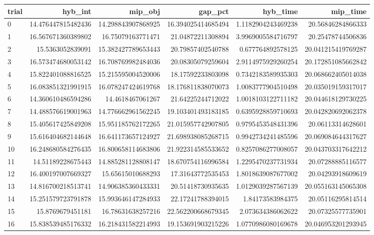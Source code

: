 \begin{tabular}{lrrrrr}
\hline
trial & hyb_int & mip_obj & gap_pct & hyb_time & mip_time \\ \hline
0 & 14.476447815482436 & 14.298843907868925 & 16.394025414685494 & 1.1182904243469238 & 20.56846284866333 \\
1 & 16.567671360389802 & 16.75079163771471 & 21.04872211308894 & 3.9969005584716797 & 20.25478744506836 \\
2 & 15.5363052839091 & 15.382427789653443 & 20.79857402540788 & 0.677764892578125 & 20.041215419769287 \\
3 & 16.573474680053142 & 16.708769982484036 & 20.08305079259604 & 2.9114975929260254 & 20.172851085662842 \\
4 & 15.822401088816525 & 15.215595004520006 & 18.17592233803098 & 0.7342183589935303 & 20.068662405014038 \\
5 & 16.083851321991915 & 16.078247424619768 & 18.176811838070073 & 1.0083777904510498 & 20.035019159317017 \\
6 & 14.360610486594286 & 14.4618467061267 & 21.64225244712022 & 1.0018103122711182 & 20.044618129730225 \\
7 & 14.488576619001963 & 14.776662961562245 & 19.103401493183185 & 0.6395928859710693 & 20.042820692062378 \\
8 & 15.405617425849208 & 15.951185762172265 & 21.015957742907805 & 0.9795453548431396 & 20.06113314628601 \\
9 & 15.616404682144648 & 16.641173657124927 & 21.698938085268715 & 0.9942734241485596 & 20.069084644317627 \\
10 & 16.248680584276435 & 16.800658114683806 & 21.922314585533652 & 0.8257086277008057 & 20.043703317642212 \\
11 & 14.51189228675443 & 14.885281128808147 & 18.670754116996584 & 1.2295470237731934 & 20.07288885116577 \\
12 & 16.400197007669327 & 15.65615010688293 & 17.31643772535453 & 1.8018639087677002 & 20.04293918609619 \\
13 & 14.816700218513741 & 14.906385360433331 & 20.51418730935635 & 1.0129039287567139 & 20.055163145065308 \\
14 & 15.251579723791878 & 15.993646147284933 & 22.17241788394015 & 1.84173583984375 & 20.05116295814514 \\
15 & 15.8769679451181 & 16.78631638257216 & 22.562200668679345 & 2.073634386062622 & 20.07325577735901 \\
16 & 15.838539485176332 & 16.218431582214993 & 19.153691903215226 & 1.0770986080169678 & 20.046953201293945 \\

\end{tabular}

